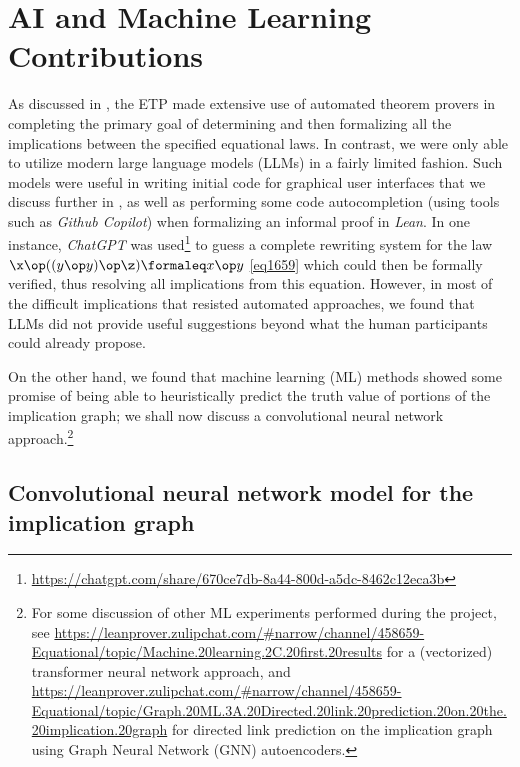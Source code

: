 \section{AI and Machine Learning Contributions}\label{ml-sec}

As discussed in , the ETP made extensive use of automated theorem provers in completing the primary goal of determining and then formalizing all the implications between the specified equational laws.  In contrast, we were only able to utilize modern large language models (LLMs) in a fairly limited fashion.  Such models were useful in writing initial code for graphical user interfaces that we discuss further in , as well as performing some code autocompletion (using tools such as \emph{Github Copilot}) when formalizing an informal proof in \emph{Lean}.  In one instance, \emph{ChatGPT} was used\footnote{\url{https://chatgpt.com/share/670ce7db-8a44-800d-a5dc-8462c12eca3b}} to guess a complete rewriting system for the law $\x \op ((y \op y) \op \z) \formaleq x \op y$ \eqref{eq1659} which could then be formally verified, thus resolving all implications from this equation. However, in most of the difficult implications that resisted automated approaches, we found that LLMs did not provide useful suggestions beyond what the human participants could already propose.

On the other hand, we found that machine learning (ML) methods showed some promise of being able to heuristically predict the truth value of portions of the implication graph; we shall now discuss a convolutional neural network approach.\footnote{For some discussion of other ML experiments performed during the project, see \url{https://leanprover.zulipchat.com/\#narrow/channel/458659-Equational/topic/Machine.20learning.2C.20first.20results} for a (vectorized) transformer neural network approach, and \url{https://leanprover.zulipchat.com/\#narrow/channel/458659-Equational/topic/Graph.20ML.3A.20Directed.20link.20prediction.20on.20the.20implication.20graph} for directed link prediction on the implication graph using Graph Neural Network (GNN) autoencoders.}

\subsection{Convolutional neural network model for the implication graph}

